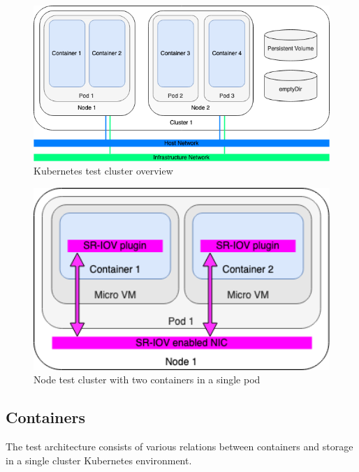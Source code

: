\begin{figure}[ht]
  \begin{center}
    \includegraphics[width=13.5cm]{images/TestArchitectureCluster.png}
    \caption{Kubernetes test cluster overview}
    \label{fig:TestArchitectureCluster}
  \end{center}
\end{figure}

\begin{figure}[ht]
  \begin{center}
    \includegraphics[width=13.5cm]{images/TestArchitectureNode.png}
    \caption{Node test cluster with two containers in a single pod}
    \label{fig:TestArchitectureNode}
  \end{center}
\end{figure}

\subsection{Containers}

The test architecture consists of various relations between containers and storage in a single cluster Kubernetes environment.

